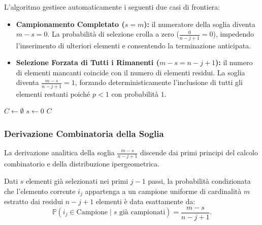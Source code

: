 L'algoritmo gestisce automaticamente i seguenti due casi di frontiera:
\begin{itemize}
  \item \textbf{Campionamento Completato ($s = m$):} il numeratore della soglia diventa $m - s = 0$. La probabilità di selezione crolla a zero ($\frac{0}{n - j + 1} = 0$), impedendo l'inserimento di ulteriori elementi e consentendo la terminazione anticipata.
  \item \textbf{Selezione Forzata di Tutti i Rimanenti ($m - s = n - j + 1$):} il numero di elementi mancanti coincide con il numero di elementi residui. La soglia diventa $\frac{m - s}{n - j + 1} = 1$, forzando deterministicamente l'inclusione di tutti gli elementi restanti poiché $p < 1$ con probabilità $1$.
\end{itemize}

\begin{algorithm}[H]
  \caption{Algorithm S (Selection Sampling di Fan, Muller, Rezucha / Knuth)}
  \label{alg:algorithm-s}
  $C \leftarrow \emptyset$\;
  $s \leftarrow 0$
  \Return $C$\;
\end{algorithm}

\subsubsection{Derivazione Combinatoria della Soglia}
La derivazione analitica della soglia $\frac{m - s}{n - j + 1}$ discende dai primi principi del calcolo combinatorio e della distribuzione ipergeometrica.

\begin{theorem}
Dati $s$ elementi già selezionati nei primi $j - 1$ passi, la probabilità condizionata che l'elemento corrente $i_j$ appartenga a un campione uniforme di cardinalità $m$ estratto dai residui $n - j + 1$ elementi è data esattamente da:
\begin{equation}
  \mathbb{P}(i_j \in \text{Campione} \mid s \text{ già campionati}) = \frac{m - s}{n - j + 1}.
\end{equation}
\end{theorem}

